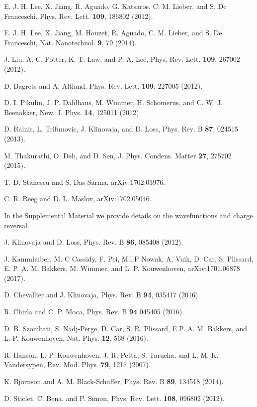 \documentclass[prl,twocolumn,showpacs,floatfix,amsbsy,amsbsy,superscriptaddress]{revtex4-1}
\begin{document}
\begin{thebibliography}{99}
 E. J. H. Lee, X. Jiang, R. Aguado, G. Katsaros, C. M. Lieber, and S. De Franceschi, Phys. Rev. Lett. {\bf 109}, 186802 (2012).

 E. J. H. Lee, X. Jiang, M. Houzet, R. Aguado, C. M. Lieber, and S. De Franceschi, Nat. Nanotechnol. {\bf 9}, 79 (2014).

 J. Liu, A. C. Potter, K. T. Law, and P. A. Lee, Phys. Rev. Lett. {\bf 109}, 267002 (2012).

 D. Bagrets and A. Altland, Phys. Rev. Lett. {\bf 109}, 227005 (2012).

  D. I. Pikulin, J. P. Dahlhaus, M. Wimmer, H. Schomerus, and C. W. J. Beenakker, New. J. Phys. {\bf 14}, 125011 (2012).

 D. Rainis, L. Trifunovic, J. Klinovaja, and D. Loss,
Phys. Rev. B {\bf 87}, 024515 (2013).

 M. Thakurathi, O. Deb, and D. Sen, J. Phys. Condens. Matter {\bf 27}, 275702 (2015).

 T. D. Stanescu and S. Das Sarma, arXiv:1702.03976.

 C.  R. Reeg and D. L. Maslov, arXiv:1702.05046.

 In the Supplemental Material we provide details on the wavefunctions and charge reversal.

 J. Klinovaja and D. Loss, Phys. Rev. B {\bf 86}, 085408 (2012).

 J. Kammhuber, M. C Cassidy, F. Pei, M.l P Nowak, A. Vuik, D. Car, S. Plissard, E. P. A. M. Bakkers, M. Wimmer, and L. P. Kouwenhoven, arXiv:1701.06878 (2017).

 D. Chevallier and J. Klinovaja, Phys. Rev. B {\bf 94}, 035417 (2016).

 R. Chirla and C. P. Moca, Phys. Rev. B {\bf 94} 045405 (2016).

 D. B. Szombati, S. Nadj-Perge, D. Car, S. R. Plissard, 
E.P. A. M. Bakkers, and L. P. Kouwenhoven, Nat. Phys. {\bf 12}, 568 (2016).


 R. Hanson, L. P. Kouwenhoven, J. R. Petta, S. Tarucha, and L. M. K. Vandersypen,
Rev. Mod. Phys. {\bf 79}, 1217 (2007).

 K. Björnson and A. M. Black-Schaffer, Phys. Rev. B {\bf 89}, 134518 (2014).

 D. Sticlet, C. Bena, and P. Simon, Phys. Rev. Lett. {\bf 108}, 096802 (2012).



\end{thebibliography}
\end{document}
